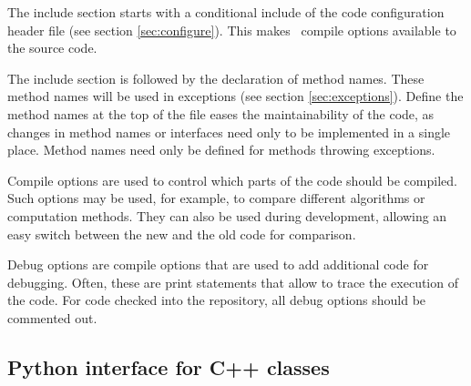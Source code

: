 \documentclass{article}[12pt,a4]
\begin{document}
The include section starts with a conditional include of the code configuration header file
(see section \ref{sec:configure}).
This makes \this\ compile options available to the source code.

The include section is followed by the declaration of method names.
These method names will be used in exceptions (see section \ref{sec:exceptions}).
Define the method names at the top of the file eases the maintainability of the code,
as changes in method names or interfaces need only to be implemented in a single 
place.
Method names need only be defined for methods throwing exceptions.

Compile options are used to control which parts of the code should be compiled.
Such options may be used, for example, to compare different algorithms or computation
methods.
They can also be used during development, allowing an easy switch between the new and
the old code for comparison.

Debug options are compile options that are used to add additional code for debugging.
Often, these are print statements that allow to trace the execution of the code.
For code checked into the repository, all debug options should be commented out.


\subsection{Python interface for C++ classes}
\label{sec:pyhton}
\end{document}
